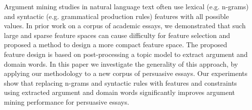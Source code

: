 Argument mining studies in natural language text often use lexical (e.g. n-grams) and syntactic (e.g. grammatical production rules) features with all possible values. In prior work on a corpus of academic essays, we demonstrated that such large and sparse feature spaces can cause difficulty for feature selection and proposed a method to design a more compact feature space. The proposed feature design is based on post-processing a topic model to extract argument and domain words. In this paper we investigate the generality of this approach, by applying our methodology to a new corpus of persuasive essays. Our experiments show that replacing  n-grams and syntactic rules with features and constraints using extracted  argument and domain words significantly improves argument mining performance for persuasive essays.
